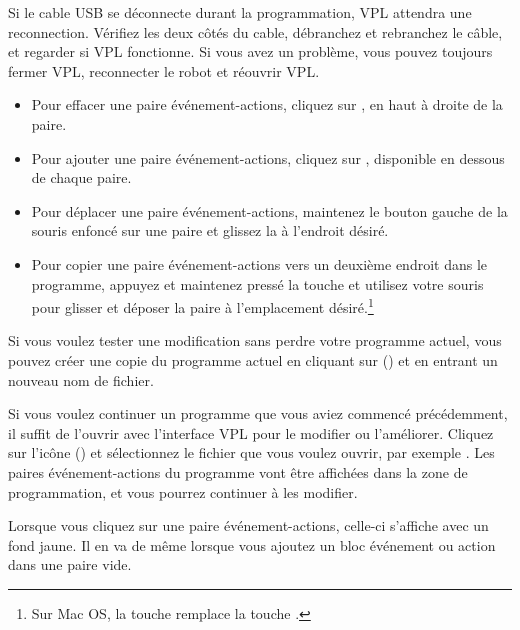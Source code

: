 Si le cable USB se déconnecte durant la programmation, VPL attendra une reconnection.
Vérifiez les deux côtés du cable, débranchez et rebranchez le câble, et regarder si VPL fonctionne.
Si vous avez un problème, vous pouvez toujours fermer VPL, reconnecter le robot et réouvrir VPL.


\begin{itemize}
\item Pour effacer une paire événement-actions, cliquez sur , en haut à droite de la paire.
\item Pour ajouter une paire événement-actions, cliquez sur , disponible en dessous de chaque paire.
\item Pour déplacer une paire événement-actions, maintenez le bouton gauche de la souris enfoncé sur une paire et glissez la à l'endroit désiré.
\item Pour copier une paire événement-actions vers un deuxième endroit dans le programme, appuyez et maintenez pressé la touche  et utilisez votre souris pour glisser et déposer la paire à l'emplacement désiré.\label{p.copy-pairs}\footnote{Sur Mac OS, la touche  remplace la touche .}
\end{itemize}


Si vous voulez tester une modification sans perdre votre programme actuel, vous pouvez créer une copie du programme actuel en cliquant sur  () et en entrant un nouveau nom de fichier.


Si vous voulez continuer un programme que vous aviez commencé précédemment, il suffit de l'ouvrir avec l'interface VPL pour le modifier ou l'améliorer.
Cliquez sur l'icône  () et sélectionnez le fichier que vous voulez ouvrir, par exemple .
Les paires événement-actions du programme vont être affichées dans la zone de programmation, et vous pourrez continuer à les modifier.

{}

Lorsque vous cliquez sur une paire événement-actions,
celle-ci s'affiche avec un fond jaune.
Il en va de même lorsque vous ajoutez un bloc événement ou action dans une paire vide.

